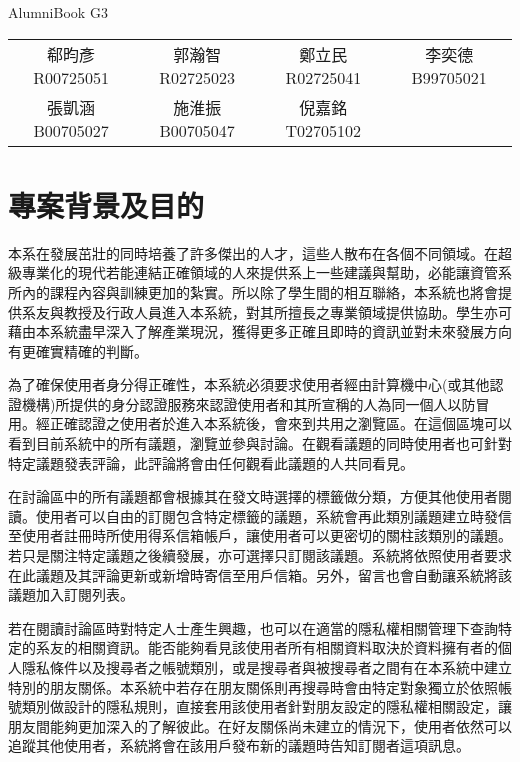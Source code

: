\documentclass[11pt]{article}
\begin{document}
\begin{center}{\Huge AlumniBook} {G3} \end{center}

\begin{center}
\begin{tabular}{cccc}
郗昀彥 R00725051&郭瀚智 R02725023&鄭立民 R02725041&李奕德 B99705021 \\
張凱涵 B00705027&施淮振 B00705047&倪嘉銘 T02705102&
\end{tabular} 
\vskip 1cm
\noindent\makebox[\linewidth]{\rule{\linewidth}{1pt}}
\end{center}

\tableofcontents

\section{專案背景及目的}

本系在發展茁壯的同時培養了許多傑出的人才，這些人散布在各個不同領域。在超級專業化的現代若能連結正確領域的人來提供系上一些建議與幫助，必能讓資管系所內的課程內容與訓練更加的紮實。所以除了學生間的相互聯絡，本系統也將會提供系友與教授及行政人員進入本系統，對其所擅長之專業領域提供協助。學生亦可藉由本系統盡早深入了解產業現況，獲得更多正確且即時的資訊並對未來發展方向有更確實精確的判斷。

為了確保使用者身分得正確性，本系統必須要求使用者經由計算機中心(或其他認證機構)所提供的身分認證服務來認證使用者和其所宣稱的人為同一個人以防冒用。經正確認證之使用者於進入本系統後，會來到共用之瀏覽區。在這個區塊可以看到目前系統中的所有議題，瀏覽並參與討論。在觀看議題的同時使用者也可針對特定議題發表評論，此評論將會由任何觀看此議題的人共同看見。

在討論區中的所有議題都會根據其在發文時選擇的標籤做分類，方便其他使用者閱讀。使用者可以自由的訂閱包含特定標籤的議題，系統會再此類別議題建立時發信至使用者註冊時所使用得系信箱帳戶，讓使用者可以更密切的關柱該類別的議題。若只是關注特定議題之後續發展，亦可選擇只訂閱該議題。系統將依照使用者要求在此議題及其評論更新或新增時寄信至用戶信箱。另外，留言也會自動讓系統將該議題加入訂閱列表。

若在閱讀討論區時對特定人士產生興趣，也可以在適當的隱私權相關管理下查詢特定的系友的相關資訊。能否能夠看見該使用者所有相關資料取決於資料擁有者的個人隱私條件以及搜尋者之帳號類別，或是搜尋者與被搜尋者之間有在本系統中建立特別的朋友關係。本系統中若存在朋友關係則再搜尋時會由特定對象獨立於依照帳號類別做設計的隱私規則，直接套用該使用者針對朋友設定的隱私權相關設定，讓朋友間能夠更加深入的了解彼此。在好友關係尚未建立的情況下，使用者依然可以追蹤其他使用者，系統將會在該用戶發布新的議題時告知訂閱者這項訊息。
\end{document}

